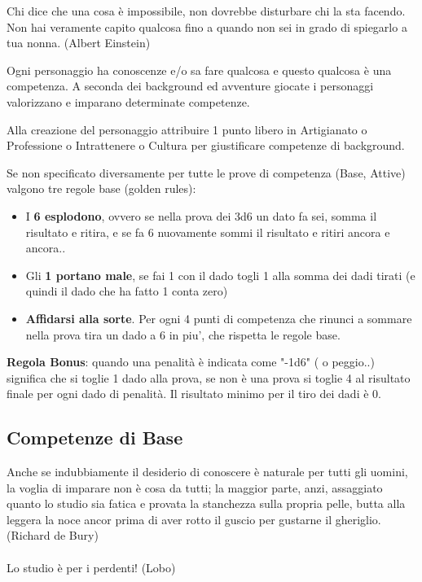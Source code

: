 \documentclass[a4paper,11pt,twoside,openany]{book}
\begin{document}
\label{competenze}
\begin{tcolorbox}[enhanced,arc=5pt,boxrule=0.3pt]{
Chi dice che una cosa è impossibile, non dovrebbe disturbare chi la sta facendo.\\
Non hai veramente capito qualcosa fino a quando non sei in grado di spiegarlo a tua nonna. (Albert Einstein)}\end{tcolorbox}\medskip


Ogni personaggio ha conoscenze e/o sa fare qualcosa e questo qualcosa è una competenza. A seconda dei background ed avventure giocate i personaggi valorizzano e imparano determinate competenze.

Alla creazione del personaggio attribuire 1 punto libero in Artigianato o Professione o Intrattenere o Cultura per giustificare competenze di background.

Se non specificato diversamente per tutte le prove di competenza (Base, Attive) valgono tre regole base  (golden rules):

\begin{itemize}
	\item
	      I \textbf{6 esplodono}, ovvero se nella prova dei 3d6 un dato fa sei, somma il risultato e ritira, e se fa 6 nuovamente sommi il risultato e ritiri ancora e ancora..
	\item
	      Gli \textbf{1 portano male}, se fai 1 con il dado togli 1 alla somma dei dadi tirati (e quindi il dado che ha fatto 1 conta zero)
	\item
	      \textbf{Affidarsi alla sorte}. Per ogni 4 punti di competenza che rinunci a sommare nella prova tira un dado a 6 in piu', che rispetta le regole base.
\end{itemize}

\textbf{Regola Bonus}: quando una penalità è indicata come "-1d6" ( o peggio..) significa che si toglie 1 dado alla prova, se non è una prova si toglie 4 al risultato finale per ogni dado di penalità. Il risultato minimo per il tiro dei dadi è 0.


\subsection{Competenze di Base}

\label{competenze-di-base}

\begin{tcolorbox}[enhanced,arc=5pt,boxrule=0.3pt]{
		Anche se indubbiamente il desiderio di conoscere è naturale per tutti gli uomini, la voglia di imparare non è cosa da tutti; la maggior parte, anzi, assaggiato quanto lo studio sia fatica e provata la stanchezza sulla propria pelle, butta alla leggera la noce ancor prima di aver rotto il guscio per gustarne il gheriglio. (Richard de Bury)\\\\
		Lo studio è per i perdenti! (Lobo)
	}\end{tcolorbox}\medskip
\end{document}
